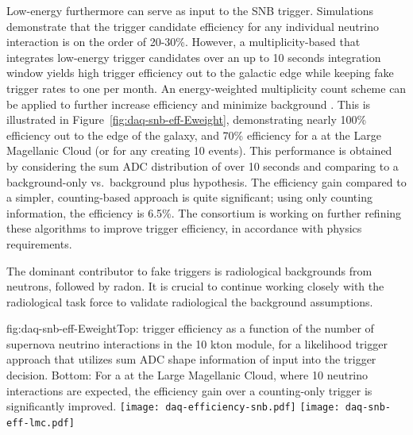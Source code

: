 Low-energy  furthermore can serve as input to the
SNB trigger. Simulations demonstrate that the trigger candidate
efficiency for any individual  neutrino interaction is on the order
of 20-30\%. However, a multiplicity-based 
 that integrates low-energy trigger candidates over an up to 10 seconds
integration window yields high trigger efficiency out to the
galactic edge while keeping fake  trigger rates to one per
month. An energy-weighted multiplicity count scheme can be
applied to further increase efficiency and minimize background
\cite{bib:docdb14522}. This is illustrated in
Figure~\ref{fig:daq-snb-eff-Eweight}, demonstrating nearly 100\% efficiency
out to the edge of the galaxy, and 70\% efficiency for a  at
the Large Magellanic Cloud (or for any  creating 10
events). This performance is obtained by considering the sum ADC
distribution of  over 10 seconds and comparing to a background-only
vs.~background plus  hypothesis. The efficiency gain compared to a
simpler,  counting-based approach is quite significant; using
only counting information, the efficiency is 6.5\%. The 
consortium is working on further refining these algorithms to improve
 trigger efficiency, in accordance with  physics
requirements.

The dominant contributor to fake  triggers is
radiological backgrounds from neutrons, followed by radon. It is
crucial to continue working closely with the radiological task force
to validate radiological the background assumptions.

\begin{dunefigure}{fig:daq-snb-eff-Eweight}{Top:  trigger 
    efficiency as a function of the number of supernova neutrino
    interactions in the 10 kton module, for a likelihood trigger
    approach that utilizes sum ADC shape information of
     input into the trigger decision. Bottom:
    For a  at the Large Magellanic Cloud, where 10 neutrino
  interactions are expected, the efficiency gain over a counting-only
  trigger is significantly improved. }
  \texttt{[image: daq-efficiency-snb.pdf]}%
\newline
  \texttt{[image: daq-snb-eff-lmc.pdf]}%
\end{dunefigure}

